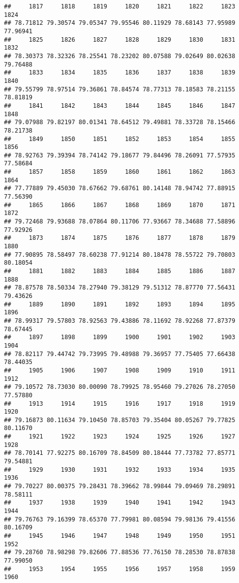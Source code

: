 \documentclass[
]{article}
\begin{document}
\begin{verbatim}
##     1817     1818     1819     1820     1821     1822     1823     1824 
## 78.71812 79.30574 79.05347 79.95546 80.11929 78.68143 77.95989 77.96941 
##     1825     1826     1827     1828     1829     1830     1831     1832 
## 78.30373 78.32326 78.25541 78.23202 80.07588 79.02649 80.02638 79.76488 
##     1833     1834     1835     1836     1837     1838     1839     1840 
## 79.55799 78.97514 79.36861 78.84574 78.77313 78.18583 78.21155 78.81819 
##     1841     1842     1843     1844     1845     1846     1847     1848 
## 79.07988 79.82197 80.01341 78.64512 79.49881 78.33728 78.15466 78.21738 
##     1849     1850     1851     1852     1853     1854     1855     1856 
## 78.92763 79.39394 78.74142 79.18677 79.84496 78.26091 77.57935 77.58684 
##     1857     1858     1859     1860     1861     1862     1863     1864 
## 77.77889 79.45030 78.67662 79.68761 80.14148 78.94742 77.88915 77.56390 
##     1865     1866     1867     1868     1869     1870     1871     1872 
## 79.72468 79.93688 78.07864 80.11706 77.93667 78.34688 77.58896 77.92926 
##     1873     1874     1875     1876     1877     1878     1879     1880 
## 77.90895 78.58497 78.60238 77.91214 80.18478 78.55722 79.70803 80.18054 
##     1881     1882     1883     1884     1885     1886     1887     1888 
## 78.87578 78.50334 78.27940 79.38129 79.51312 78.87770 77.56431 79.43626 
##     1889     1890     1891     1892     1893     1894     1895     1896 
## 78.99317 79.57803 78.92563 79.43886 78.11692 78.92268 77.87379 78.67445 
##     1897     1898     1899     1900     1901     1902     1903     1904 
## 78.82117 79.44742 79.73995 79.48988 79.36957 77.75405 77.66438 78.44035 
##     1905     1906     1907     1908     1909     1910     1911     1912 
## 79.10572 78.73030 80.00090 78.79925 78.95460 79.27026 78.27050 77.57880 
##     1913     1914     1915     1916     1917     1918     1919     1920 
## 79.16873 80.11634 79.10450 78.85703 79.35404 80.05267 79.77825 80.11670 
##     1921     1922     1923     1924     1925     1926     1927     1928 
## 78.70141 77.92275 80.16709 78.84509 80.18444 77.73782 77.85771 79.54881 
##     1929     1930     1931     1932     1933     1934     1935     1936 
## 79.70227 80.00375 79.28431 78.39662 78.99844 79.09469 78.29891 78.58111 
##     1937     1938     1939     1940     1941     1942     1943     1944 
## 79.76763 79.16399 78.65370 77.79981 80.08594 79.98136 79.41556 80.16709 
##     1945     1946     1947     1948     1949     1950     1951     1952 
## 79.28760 78.98298 79.82606 77.88536 77.76150 78.28530 78.87838 77.99050 
##     1953     1954     1955     1956     1957     1958     1959     1960 

\end{verbatim}
\end{document}
